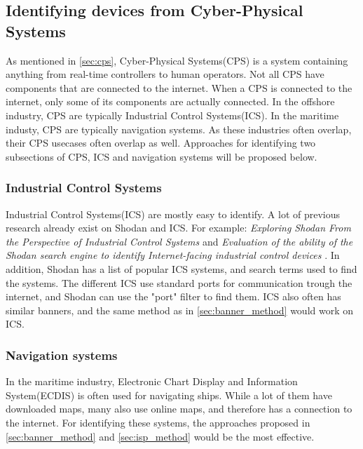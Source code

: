 \subsection{Identifying devices from Cyber-Physical Systems} \label{sec:identify_cps}
As mentioned in \cref{sec:cps}, Cyber-Physical Systems(CPS) is a system containing anything from real-time controllers to human operators. Not all CPS have components that are connected to the internet. When a CPS is connected to the internet, only some of its components are actually connected. In the offshore industry, CPS are typically Industrial Control Systems(ICS). In the maritime industy, CPS are typically navigation systems. As these industries often overlap, their CPS usecases often overlap as well. Approaches for identifying two subsections of CPS, ICS and navigation systems will be proposed below.

\subsubsection{Industrial Control Systems}
Industrial Control Systems(ICS) are mostly easy to identify. A lot of previous research already exist on Shodan and ICS. For example: \textit{Exploring Shodan From the Perspective of Industrial Control Systems}\cite{bodenheim_butts_dunlap_mullins_2014} and \textit{Evaluation of the ability of the Shodan search engine to identify Internet-facing industrial control devices} \cite{ICS_shodan_article}.  In addition, Shodan has a list of popular ICS systems, and search terms used to find the systems.\cite{shodan_ics} The different ICS use standard ports for communication trough the internet, and Shodan can use the "port" filter to find them. ICS also often has similar banners, and the same method as in \cref{sec:banner_method} would work on ICS.

\subsubsection{Navigation systems}
In the maritime industry, Electronic Chart Display and Information System(ECDIS) is often used for navigating ships. While a lot of them have downloaded maps, many also use online maps, and therefore has a connection to the internet. For identifying these systems, the approaches proposed in \cref{sec:banner_method} and \cref{sec:isp_method} would be the most effective.

\newpage

